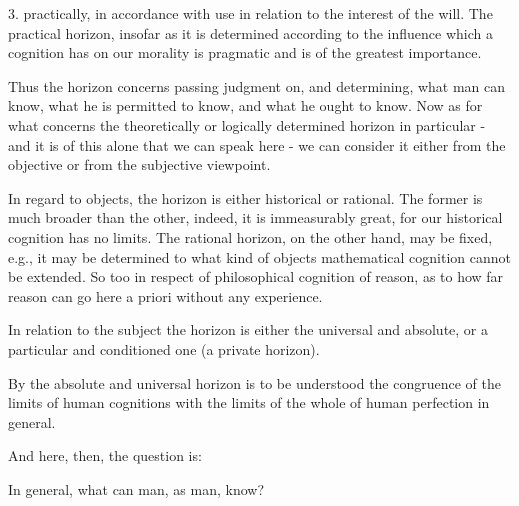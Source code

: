     3. practically, in accordance with use in relation to the interest of the will.
    The practical horizon, insofar as it is determined according to the influence
    which a cognition has on our morality is pragmatic and is of the greatest importance.

    Thus the horizon concerns passing judgment on, and determining,
    what man can know, what he is permitted to know, and what he ought to know.
    Now as for what concerns the theoretically or logically determined horizon
    in particular - and it is of this alone that we can speak here - we can
    consider it either from the objective or from the subjective viewpoint.

    In regard to objects, the horizon is either historical or rational.
    The former is much broader than the other, indeed, it is immeasurably great,
    for our historical cognition has no limits.
    The rational horizon, on the other hand, may be fixed,
    e.g., it may be determined to what kind of objects
    mathematical cognition cannot be extended.
    So too in respect of philosophical cognition of reason,
    as to how far reason can go here a priori without any experience.

    In relation to the subject the horizon is either the universal and absolute,
    or a particular and conditioned one (a private horizon).

    By the absolute and universal horizon is to be understood
    the congruence of the limits of human cognitions with
    the limits of the whole of human perfection in general.

    And here, then, the question is:

    In general, what can man, as man, know?

